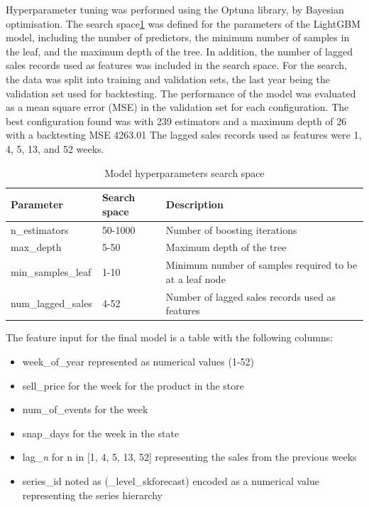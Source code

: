 Hyperparameter tuning was performed using the Optuna library\cite{optuna_2019}, by Bayesian optimisation.
The search space\ref{tab:hyperparam_search_space} was defined for the parameters of the LightGBM model, including the number of predictors, the minimum number of samples in the leaf, and the maximum depth of the tree.
In addition, the number of lagged sales records used as features was included in the search space.
For the search, the data was split into training and validation sets, the last year being the validation set used for backtesting.
The performance of the model was evaluated as a mean square error (MSE) in the validation set for each configuration.
The best configuration found was with 239 estimators and a maximum depth of 26 with a backtesting MSE 4263.01
The lagged sales records used as features were 1, 4, 5, 13, and 52 weeks.
\begin{table}
    \centering
    \begin{tabular}{|l|l|l|}
        \hline
        Parameter          & Search space & Description                                             \\
        \hline
        n\_estimators      & 50-1000      & Number of boosting iterations                           \\
        max\_depth         & 5-50         & Maximum depth of the tree                               \\
        min\_samples\_leaf & 1-10         & Minimum number of samples required to be at a leaf node \\
        num\_lagged\_sales & 4-52         & Number of lagged sales records used as features         \\
        \hline
    \end{tabular}
    \caption{Model hyperparameters search space}
    \label{tab:hyperparam_search_space}
\end{table}

The feature input for the final model is a table with the following columns:
\begin{itemize}
    \item week\_of\_year represented as numerical values (1-52)
    \item sell\_price for the week for the product in the store
    \item num\_of\_events for the week
    \item snap\_days for the week in the state
    \item lag\_\emph{n} for n in [1, 4, 5, 13, 52] representing the sales from the previous weeks
    \item series\_id noted as (\_level\_skforecast) encoded as a numerical value representing the series hierarchy
\end{itemize}

